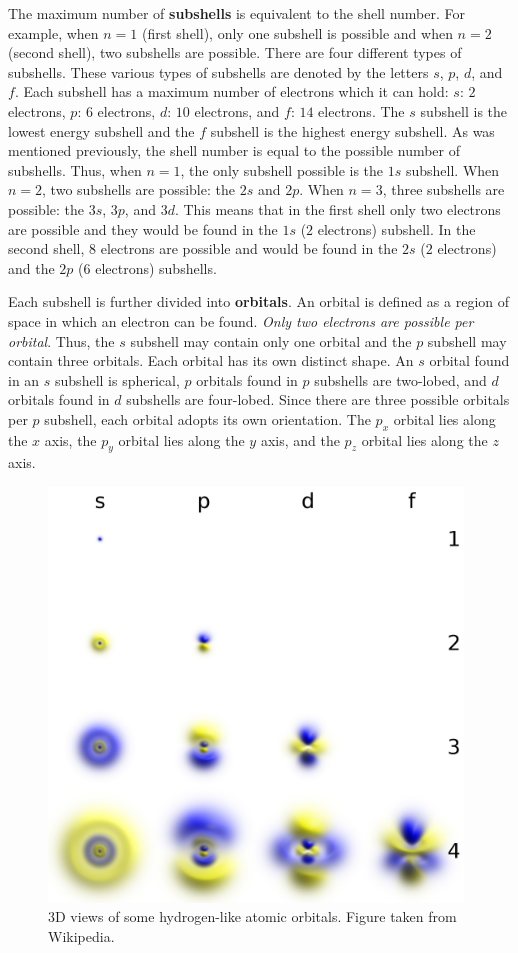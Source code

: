 \documentclass[a4paper,10pt]{article}
\begin{document}
{\noindent}The maximum number of \textbf{subshells} is equivalent to the shell number. For example, when $n=1$ (first shell), only one subshell is possible and when $n=2$ (second shell), two subshells are possible. There are four different types of subshells. These various types of subshells are denoted by the letters $s$, $p$, $d$, and $f$. Each subshell has a maximum number of electrons which it can hold: $s$: $2$ electrons, $p$: $6$ electrons, $d$: $10$ electrons, and $f$: $14$ electrons. The $s$ subshell is the lowest energy subshell and the $f$ subshell is the highest energy subshell. As was mentioned previously, the shell number is equal to the possible number of subshells. Thus, when $n=1$, the only subshell possible is the $1s$ subshell. When $n=2$, two subshells are possible: the $2s$ and $2p$. When $n=3$, three subshells are possible: the $3s$, $3p$, and $3d$. This means that in the first shell only two electrons are possible and they would be found in the $1s$ ($2$ electrons) subshell. In the second shell, $8$ electrons are possible and would be found in the $2s$ ($2$ electrons) and the $2p$ ($6$ electrons) subshells.

{\noindent}Each subshell is further divided into \textbf{orbitals}. An orbital is defined as a region of space in which an electron can be found. \textit{Only two electrons are possible per orbital}. Thus, the $s$ subshell may contain only one orbital and the $p$ subshell may contain three orbitals. Each orbital has its own distinct shape. An $s$ orbital found in an $s$ subshell is spherical, $p$ orbitals found in $p$ subshells are two-lobed, and $d$ orbitals found in $d$ subshells are four-lobed. Since there are three possible orbitals per $p$ subshell, each orbital adopts its own orientation. The $p_x$ orbital lies along the $x$ axis, the $p_y$ orbital lies along the $y$ axis, and the $p_z$ orbital lies along the $z$ axis.

\begin{figure}[t]
    \centering
    \includegraphics[width=11cm]{figures/orbitals_3D.png}
    \caption{\footnotesize{3D views of some hydrogen-like atomic orbitals. Figure taken from Wikipedia.}}
    \label{fig:orbitals3D}
\end{figure}
\end{document}
